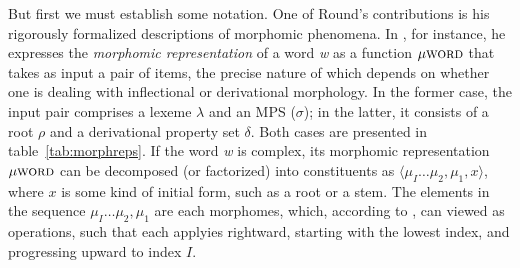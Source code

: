   But first we must establish some notation. 
  One of Round's contributions is his rigorously formalized descriptions of 
  morphomic phenomena. In \cite{round:2011}, for instance, 
  he expresses the \emph{morphomic representation} of a word 
  \textit{w} as a function $\mu{\textsc{word}}$ that 
  takes as input a pair of items, the precise nature
  of which depends on whether one is dealing with inflectional or 
  derivational morphology. In the former case, the input pair comprises 
  a lexeme $\lambda$ and an \ac{MPS} ($\sigma$); in the latter, 
  it consists of a root $\rho$ and a derivational property set $\delta$. 
  Both cases are presented in table~\ref{tab:morphreps}. If the word \textit{w} 
 is complex, its morphomic representation $\mu{\textsc{word}}$ 
  can be decomposed (or factorized) into constituents as  
  $\langle  \mu_{I} \dots \mu_{2}, \mu_{1}, x \rangle$, where $x$ 
  is some kind of initial form, such as a root or a stem. The elements in the sequence 
  $ \mu_{I} \dots \mu_{2}, \mu_{1}$ are each morphomes, 
  which, according to \cite{round:2015}, can viewed as operations, 
  such that each applyies rightward, starting with the lowest index, and progressing upward
  to index $I$.
  

